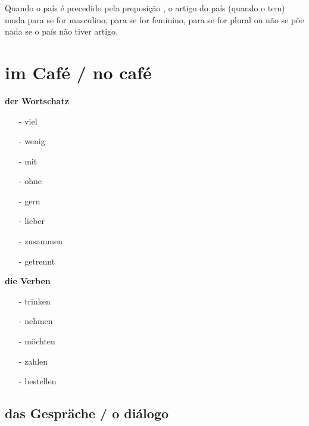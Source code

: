             Quando o país é precedido pela preposição , o artigo do país (quando o tem) muda para  se for masculino, para  se for feminino, para  se for plural ou não se põe nada se o país não tiver artigo.

    \pagebreak\section{im Café / no café}\label{section:deutsch:im_cafe}
    
        \begin{multicols}{2}
            \textbf{der Wortschatz}
            \begin{itemize}[before=\renewcommand{\baselinestretch}{1},topsep=0pt,itemsep=4pt,parsep=0pt]
                \item[-] viel 
                \item[-] wenig 
                \item[-] mit 
                \item[-] ohne 
                \item[-] gern 
                \item[-] lieber 
                \item[-] zusammen 
                \item[-] getrennt  
            \end{itemize}
        \vfill\null
        \columnbreak
            \textbf{die Verben}
            \begin{itemize}[before=\renewcommand{\baselinestretch}{1},topsep=0pt,itemsep=4pt,parsep=0pt]
                \item[-] trinken 
                \item[-] nehmen 
                \item[-] möchten 
                \item[-] zahlen 
                \item[-] bestellen  
            \end{itemize}
        \vfill\null
        \end{multicols}

        \subsection{das Gespräche / o diálogo}\label{subsection:deutsch:im_cafe:das_gesprache}

